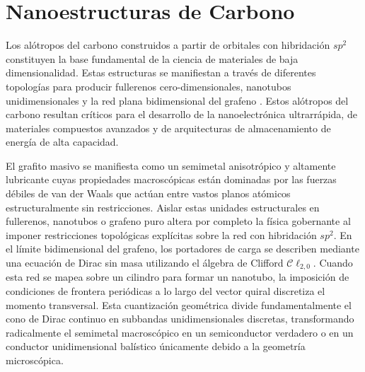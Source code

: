 \documentclass[pdflatex,sn-mathphys-num]{sn-jnl}
\theoremstyle{thmstyleone}%
\theoremstyle{thmstyletwo}%
\theoremstyle{thmstylethree}%
\begin{document}
\section{Nanoestructuras de Carbono}
\label{sec:carbono}

Los alótropos del carbono construidos a partir de orbitales con hibridación
$sp^2$ constituyen la base fundamental de la ciencia de materiales de baja
dimensionalidad. Estas estructuras se manifiestan a través de diferentes
topologías para producir fullerenos cero-dimensionales, nanotubos
unidimensionales y la red plana bidimensional del grafeno \cite{guanTopologicalEffectsCarbonbased2023}.
Estos alótropos del carbono resultan críticos para el desarrollo de la
nanoelectrónica ultrarrápida, de materiales compuestos avanzados y de
arquitecturas de almacenamiento de energía de alta capacidad.

El grafito masivo se manifiesta como un semimetal anisotrópico y altamente
lubricante cuyas propiedades macroscópicas están dominadas por las fuerzas
débiles de van der Waals que actúan entre vastos planos atómicos estructuralmente
sin restricciones. Aislar estas unidades estructurales en fullerenos, nanotubos
o grafeno puro altera por completo la física gobernante al imponer restricciones
topológicas explícitas sobre la red con hibridación $sp^2$. En el límite
bidimensional del grafeno, los portadores de carga se describen mediante una
ecuación de Dirac sin masa utilizando el álgebra de Clifford
$\mathcal{C}\ell_{2,0}$. Cuando esta red se mapea sobre un cilindro para formar
un nanotubo, la imposición de condiciones de frontera periódicas a lo largo del
vector quiral discretiza el momento transversal. Esta cuantización geométrica
divide fundamentalmente el cono de Dirac continuo en subbandas unidimensionales
discretas, transformando radicalmente el semimetal macroscópico en un
semiconductor verdadero o en un conductor unidimensional balístico únicamente
debido a la geometría microscópica.


\end{document}
